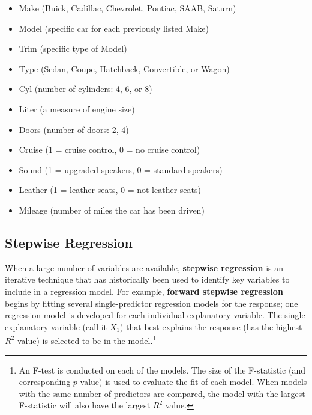 \documentclass[
]{report}
\begin{document}
\vspace{-1em}
\begin{itemize}
\item Make (Buick, Cadillac, Chevrolet, Pontiac, SAAB, Saturn)
\item Model (specific car for each previously listed Make)
\item Trim (specific type of Model)
\item Type (Sedan, Coupe, Hatchback, Convertible, or Wagon)
\item Cyl (number of cylinders: 4, 6, or 8)
\item Liter (a measure of engine size)
\item Doors (number of doors: 2, 4)
\item Cruise (1 = cruise control, 0 = no cruise control)
\item Sound (1 = upgraded speakers, 0 = standard speakers)
\item Leather (1 = leather seats, 0 = not leather seats)
\item Mileage (number of miles the car has been driven)
\end{itemize}

\hypertarget{stepwise-regression}{%
\subsection*{Stepwise Regression}\label{stepwise-regression}}

When a large number of variables are available, \textbf{stepwise regression} is an iterative technique that has historically been used to identify key variables to include in a regression model. For example, \textbf{forward stepwise regression} begins by fitting several single-predictor regression models for the response; one regression model is developed for each individual explanatory variable. The single explanatory variable (call it \(\scriptstyle X_1\)) that best explains the response (has the highest \(\scriptstyle {R}^2\) value) is selected to be in the model.\footnote{An F-test is conducted on each of the models. The size of the F-statistic (and corresponding \(\scriptstyle p\)-value) is used to evaluate the fit of each model. When models with the same number of predictors are compared, the model with the largest F-statistic will also have the largest \(\scriptstyle {R}^2\) value.}
\end{document}
